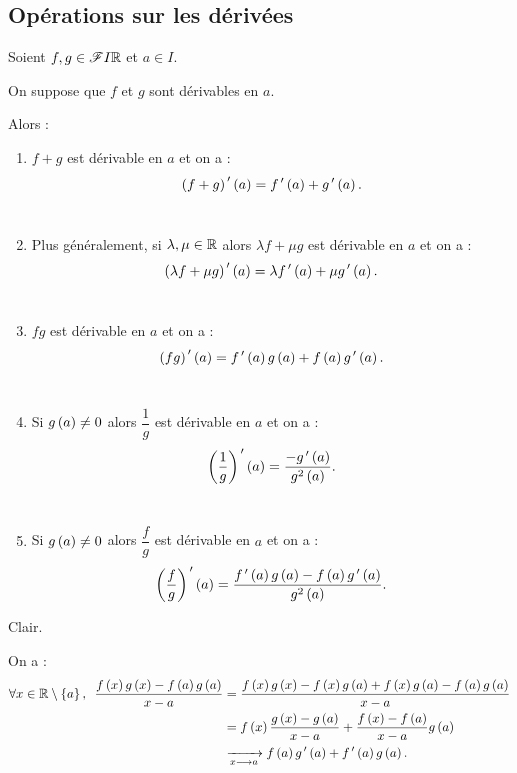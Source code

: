 \subsection{Opérations sur les dérivées}

\begin{prop}
Soient \(f,g\in\mathscr{F}{I}{\mathbb{R}}\) et \(a\in I\).

On suppose que \(f\) et \(g\) sont dérivables en \(a\).

Alors :

\begin{enumerate}
\item \(f+g\) est dérivable en \(a\) et on a : \[\left(f+g\right)^{\,\prime}\left(a\right)=f^{\,\prime}\left(a\right)+g^{\,\prime}\left(a\right).\] \\

\item Plus généralement, si \(\lambda,\mu\in\mathbb{R}\) alors \(\lambda f+\mu g\) est dérivable en \(a\) et on a : \[\left(\lambda f+\mu g\right)^{\,\prime}\left(a\right)=\lambda f^{\,\prime}\left(a\right)+\mu g^{\,\prime}\left(a\right).\] \\

\item \(fg\) est dérivable en \(a\) et on a : \[\left(fg\right)^{\,\prime}\left(a\right)=f^{\,\prime}\left(a\right)g\left(a\right)+f\left(a\right)g^{\,\prime}\left(a\right).\] \\

\item Si \(g\left(a\right)\not=0\) alors \(\dfrac{1}{g}\) est dérivable en \(a\) et on a : \[\left(\dfrac{1}{g}\right)^{\,\prime}\left(a\right)=\dfrac{-g^{\,\prime}\left(a\right)}{g^2\left(a\right)}.\] \\

\item Si \(g\left(a\right)\not=0\) alors \(\dfrac{f}{g}\) est dérivable en \(a\) et on a : \[\left(\dfrac{f}{g}\right)^{\,\prime}\left(a\right)=\dfrac{f^{\,\prime}\left(a\right)g\left(a\right)-f\left(a\right)g^{\,\prime}\left(a\right)}{g^2\left(a\right)}.\]
\end{enumerate}
\end{prop}

\begin{dem}[1 et 2]
Clair.
\end{dem}

\begin{dem}[3]
On a : \[\begin{aligned}
\quantifs{\forall x\in\R\excluant\accol{a}}\dfrac{f\paren{x}g\paren{x}-f\paren{a}g\paren{a}}{x-a}&=\dfrac{f\paren{x}g\paren{x}-f\paren{x}g\paren{a}+f\paren{x}g\paren{a}-f\paren{a}g\paren{a}}{x-a} \\
&=f\paren{x}\dfrac{g\paren{x}-g\paren{a}}{x-a}+\dfrac{f\paren{x}-f\paren{a}}{x-a}g\paren{a} \\
&\xrightarrow[x\to a]{}f\paren{a}g\prim\paren{a}+f\prim\paren{a}g\paren{a}.
\end{aligned}\]
\end{dem}

